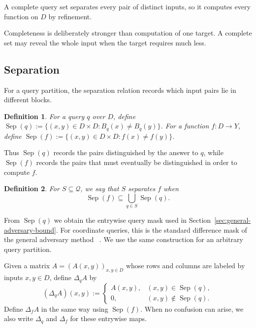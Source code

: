 \documentclass[11pt]{article}
\numberwithin{equation}{section}
\newtheorem{definition}{Definition}[section]
\theoremstyle{remark}
\begin{document}
A complete query set separates every pair of distinct inputs, so it computes
every function on $D$ by refinement.


Completeness is deliberately stronger than computation of one target.  A
complete set may reveal the whole input when the target requires much less.

\subsection{Separation}
\label{subsec:query-separation}

For a query partition, the separation relation records which input pairs lie
in different blocks.

\begin{definition}
\label{def:query-separation}
For a query $q$ over $D$, define $\operatorname{Sep}(q):=\{(x,y)\in D\times D:B_q(x)\neq B_q(y)\}$. For a function $f:D\to Y$, define $\operatorname{Sep}(f):=\{(x,y)\in D\times D:f(x)\neq f(y)\}$.
\end{definition}

Thus $\operatorname{Sep}(q)$ records the pairs distinguished by the answer to
$q$, while $\operatorname{Sep}(f)$ records the pairs that must eventually be
distinguished in order to compute $f$.

\begin{definition}
\label{def:query-set-separates-function}
For $S\subseteq\mathcal Q$, we say that $S$ \emph{separates $f$} when
\begin{equation}
    \operatorname{Sep}(f)
    \subseteq
    \bigcup_{q\in S}\operatorname{Sep}(q).
\end{equation}
\end{definition}

From $\operatorname{Sep}(q)$ we obtain the entrywise query mask used in
Section~\ref{sec:general-adversary-bound}. For coordinate queries, this is
the standard difference mask of the general adversary method
~\cite{HoyerLeeSpalek2007,LeeMittalReichardtSpalekSzegedy2011}. We use the
same construction for an arbitrary query partition.

Given a matrix $A=(A(x,y))_{x,y\in D}$ whose rows and columns are labeled by inputs $x,y\in D$, define
$\Delta_qA$ by
\begin{equation}
    (\Delta_qA)(x,y)
    :=
    \begin{cases}
        A(x,y), & (x,y)\in\operatorname{Sep}(q),\\
        0, & (x,y)\notin\operatorname{Sep}(q).
    \end{cases}
\end{equation}
Define $\Delta_fA$ in the same way using $\operatorname{Sep}(f)$.  When no
confusion can arise, we also write $\Delta_q$ and $\Delta_f$ for these
entrywise maps.
\end{document}
